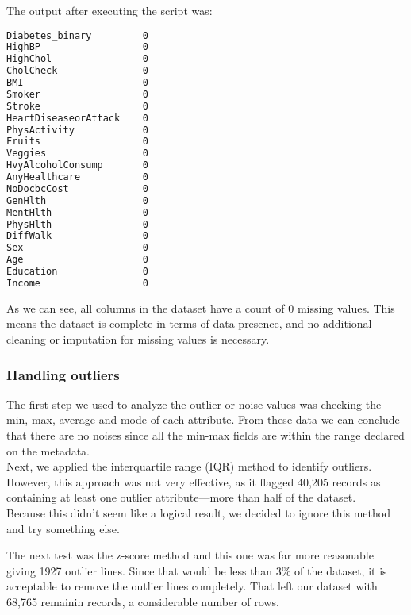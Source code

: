 

The output after executing the script was:

\begin{lstlisting}[language=bash]
Diabetes_binary         0
HighBP                  0
HighChol                0
CholCheck               0
BMI                     0
Smoker                  0
Stroke                  0
HeartDiseaseorAttack    0
PhysActivity            0
Fruits                  0
Veggies                 0
HvyAlcoholConsump       0
AnyHealthcare           0
NoDocbcCost             0
GenHlth                 0
MentHlth                0
PhysHlth                0
DiffWalk                0
Sex                     0
Age                     0
Education               0
Income                  0
\end{lstlisting}

As we can see, all columns in the dataset have a count of 0 missing values. This means the dataset is complete in terms of data presence, and no additional cleaning or imputation for missing values is necessary.

\subsubsection{Handling outliers}

The first step we used to analyze the outlier or noise values was checking the min, max, average and mode of each attribute. From these data we can conclude that there are no noises since all the min-max fields are within the range declared on the metadata.\\

\noindent Next, we applied the interquartile range (IQR) method to identify outliers. However, this approach was not very effective, as it flagged 40,205 records as containing at least one outlier attribute—more than half of the dataset.\\
Because this didn’t seem like a logical result, we decided to ignore this method and try something else.

\noindent The next test was the z-score method and this one was far more reasonable giving 1927 outlier lines. Since that would be less than 3$\%$ of the dataset, it is acceptable to remove the outlier lines completely. That left our dataset with 68,765 remainin records, a considerable number of rows.



